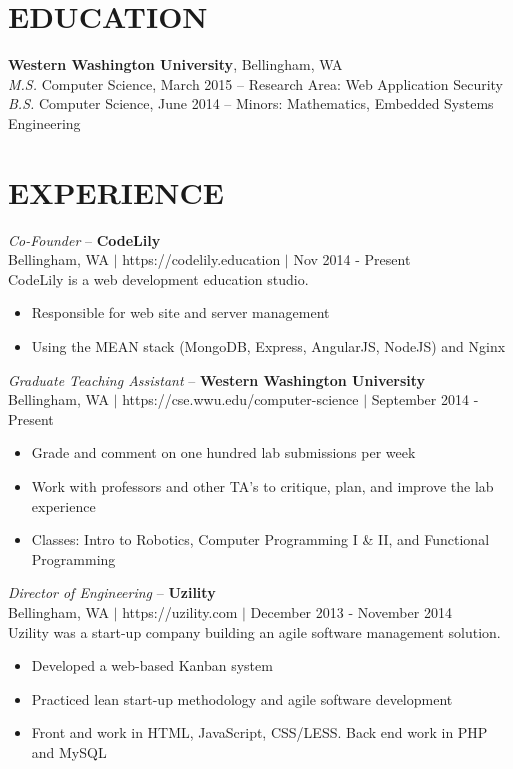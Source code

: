 \documentclass[line,margin]{res}
\begin{document}
\address{425.241.7977 $|$ kyle.rader@ieee.org $|$ https://kylerader.ninja $|$ github.com/kyle-rader}

\begin{resume}
 
\section{EDUCATION}
	{\bf Western Washington University}, Bellingham, WA \\
	{\sl M.S.} Computer Science, {\small March 2015} -- Research Area: Web Application Security \\
	{\sl B.S.} Computer Science, {\small June 2014} -- Minors: Mathematics, Embedded Systems Engineering

\section{EXPERIENCE}

	{\sl Co-Founder} -- {\bf CodeLily} \\
	{\footnotesize Bellingham, WA $|$ https://codelily.education $|$ Nov 2014 - Present}\\
	CodeLily is a web development education studio.
	\begin{itemize} \itemsep -2pt
		\item Responsible for web site and server management
		\item Using the MEAN stack (MongoDB, Express, AngularJS, NodeJS) and Nginx
	\end{itemize}

	{\sl Graduate Teaching Assistant} -- {\bf Western Washington University} \\
	{\footnotesize Bellingham, WA $|$ https://cse.wwu.edu/computer-science $|$ September 2014 - Present}
	\begin{itemize} \itemsep -2pt
		\item Grade and comment on one hundred lab submissions per week
		\item Work with professors and other TA's to critique, plan, and improve the lab experience
		\item Classes: Intro to Robotics, Computer Programming I \& II, and Functional Programming
	\end{itemize}

	{\sl Director of Engineering} -- {\bf Uzility} \\
	{\footnotesize Bellingham, WA $|$ https://uzility.com $|$ December 2013 - November 2014} \\
	Uzility was a start-up company building an agile software management solution.
	\begin{itemize}  \itemsep -2pt
		\item Developed a web-based Kanban system
		\item Practiced lean start-up methodology and agile software development
		\item Front and work in HTML, JavaScript, CSS/LESS. Back end work in PHP and MySQL
	\end{itemize}
	

\end{resume}
\end{document}
